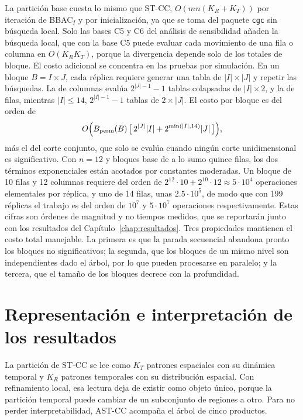 La partición base cuesta lo mismo que ST-CC, $O(mn(K_R+K_T))$ por iteración de
BBAC$_I$ y por inicialización, ya que se toma del paquete \texttt{cgc} sin
búsqueda local. Solo las bases C5 y C6 del análisis de sensibilidad añaden la
búsqueda local, que con la base C5 puede evaluar cada movimiento de una fila o
columna en $O(K_R K_T)$, porque la divergencia depende solo de los totales de
bloque. El costo adicional se
concentra en las pruebas por simulación. En un bloque $B=I\times J$, cada
réplica requiere generar una tabla de $|I|\times|J|$ y repetir las búsquedas. La
de columnas evalúa $2^{|J|-1}-1$ tablas colapsadas de $|I|\times2$, y la de
filas, mientras $|I|\le 14$, $2^{|I|-1}-1$ tablas de $2\times|J|$. El costo por
bloque es del orden de
\[
  O\Bigl(B_{\mathrm{perm}}(B)\,\bigl[\,2^{|J|}|I| + 2^{\min(|I|,14)}|J|\,\bigr]\Bigr),
\]
más el del corte conjunto, que solo se evalúa cuando ningún corte
unidimensional es significativo. Con $n=12$ y bloques base de a lo sumo quince
filas, los dos términos exponenciales están acotados por constantes moderadas. Un
bloque de 10 filas y 12 columnas requiere del orden de $2^{12}\cdot10+2^{10}\cdot12
\approx 5\cdot10^4$ operaciones elementales por réplica, y uno de 14 filas, unas
$2.5\cdot10^5$, de modo que con 199 réplicas el trabajo es del orden de $10^7$ y
$5\cdot10^7$ operaciones respectivamente. Estas cifras son órdenes de magnitud y
no tiempos medidos, que se reportarán junto con los resultados del
Capítulo~\ref{chap:resultados}.
Tres propiedades mantienen el costo total manejable. La primera es que la parada
secuencial abandona pronto los bloques no significativos; la segunda, que los
bloques de un mismo nivel son independientes dado el árbol, por lo que pueden
procesarse en paralelo; y la tercera, que el tamaño de los bloques decrece con la
profundidad.

\section{Representación e interpretación de los resultados}\label{sec:prop-representacion}

La partición de ST-CC se lee como $K_T$ patrones espaciales con su dinámica
temporal y $K_R$ patrones temporales con su distribución espacial. Con
refinamiento local, esa lectura deja de existir como objeto único, porque la
partición temporal puede cambiar de un subconjunto de regiones a otro. Para no
perder interpretabilidad, AST-CC acompaña el árbol de cinco productos.

